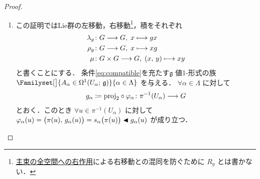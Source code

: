 \documentclass[TQFT_main]{subfiles}
\begin{document}
\begin{proof}
    \begin{enumerate}
        \item 
        この証明ではLie群の左移動，右移動\footnote{\hyperref[prop.PFD_right]{主束の全空間への右作用}による右移動との混同を防ぐために $R_g$ とは書かない．}，積をそれぞれ
        \begin{align}
            \lambda_g &\colon G \longrightarrow G,\; x \longmapsto gx \\
            \rho_g &\colon G \longrightarrow G,\; x \longmapsto xg \\
            \mu &\colon G \times G \longrightarrow G,\; (x,\, y) \longmapsto xy
        \end{align}
        と書くことにする．
        条件\eqref{eq:compatible}を充たす$\mathfrak{g}$ 値1-形式の族 $\Familyset[\big]{A_\alpha \in \Omega^1(U_\alpha;\, \mathfrak{g})}{\alpha \in \Lambda}$ を与える．
        $\forall \alpha \in \Lambda$ に対して
        \begin{align}
            g_\alpha \coloneqq \mathrm{proj}_2 \circ \varphi_\alpha \colon \pi^{-1}(U_\alpha) \longrightarrow G
        \end{align}
        とおく．このとき $\forall u \in \pi^{-1}(U_\alpha)$ に対して $\varphi_\alpha(u) = \bigl( \pi(u),\, g_\alpha(u)\bigr) = s_\alpha \bigl(\pi(u)\bigr) \blacktriangleleft g_\alpha(u)$ が成り立つ．
        

\end{enumerate}
\end{proof}
\end{document}
